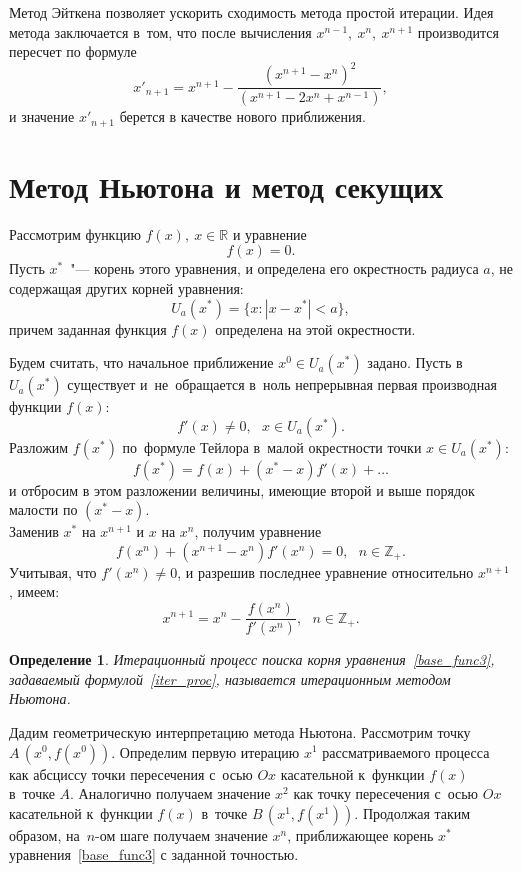 \documentclass[11pt,a4paper,twoside]{report}
\numberwithin{equation}{section}
\newtheorem*{definition}{Определение}
\theoremstyle{definition}
\theoremstyle{plain}
\begin{document}
Метод Эйткена позволяет ускорить сходимость метода простой итерации.
Идея метода заключается в~том, что после вычисления
$x^{n-1},~x^n,~x^{n+1}$ производится пересчет по формуле
%
$$
    x'_{n+1}=x^{n+1} - \frac{(x^{n+1} - x^n)^2}{(x^{n+1} - 2x^n + x^{n-1})},
$$
%
и значение $x'_{n+1}$ берется в качестве нового приближения.
%
\section{Метод Ньютона и метод секущих}
%
\label{Newton_method}
%
Рассмотрим функцию $f(x), ~x\in \mathbb{R}$ и уравнение
%
\begin{equation}
%
    \label{base_func3}
    f(x)=0.
%
\end{equation}
%
Пусть $x^*$~"--- корень этого уравнения, и определена его
окрестность радиуса $a$, не содержащая других корней уравнения:
%
$$
    U_a(x^*)=\{x:|x-x^*| < a\},
$$
%
причем заданная функция $f(x)$ определена на этой окрестности.

Будем считать, что начальное приближение $x^0 \in U_a(x^*)$ задано.
Пусть в $U_a(x^*)$ существует и~не~обращается в~ноль непрерывная
первая производная функции $f(x)$:
%
$$
    f'(x) \neq 0,~~~x\in U_a(x^*).
$$
%
Разложим $f(x^*)$ по~формуле Тейлора в~малой окрестности точки $x\in U_a(x^*)$:
%
$$
    f(x^*) =  f(x) + (x^* - x)f'(x) + \dots
$$
%
и отбросим в этом разложении величины, имеющие второй и выше порядок малости
по $(x^* - x)$.\\
Заменив $x^*$ на $x^{n+1}$ и $x$ на $x^n$, получим уравнение
%
$$
    f(x^n) + (x^{n + 1} - x^n)f'(x^n) = 0,~~~n\in \mathbb{Z}_+.
$$
%
Учитывая, что $f'(x^n) \neq 0$, и разрешив последнее уравнение относительно
$x^{n+1}$, имеем:
%
    \begin{equation}
        \label{iter_proc}
        x^{n + 1} = x^n - \frac{f(x^n)}{f'(x^n)},~~~n \in \mathbb{Z}_+.
    \end{equation}
%
\begin{definition}
%
    Итерационный процесс поиска корня уравнения~\eqref{base_func3},
    задаваемый формулой~\eqref{iter_proc},
    называется итерационным методом Ньютона.
%
\end{definition}
%

Дадим геометрическую интерпретацию метода Ньютона. Рассмотрим точку
$A\,(x^0, f(x^0))$. Определим первую итерацию $x^1$ рассматриваемого процесса
как абсциссу точки пересечения с~осью $Ox$ касательной к~функции $f(x)$
в~точке $A$. Аналогично получаем значение $x^2$ как точку пересечения
с~осью $Ox$ касательной к~функции $f(x)$ в~точке $B\,(x^1, f(x^1))$.  Продолжая
таким образом, на~$n$-ом шаге получаем значение $x^n$, приближающее
корень $x^*$ уравнения~\eqref{base_func3} с заданной точностью.
\end{document}
